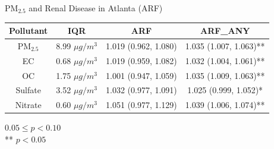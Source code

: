 \documentclass[handout]{beamer} %
\begin{document}
\begin{frame}{PM$_{2.5}$ and Renal Disease in Atlanta (ARF)}
    \begin{table}
        \small
        \centering
        \begin{tabular}{c|c|c|c}
            \hline
            Pollutant & IQR & ARF & ARF\_ANY \\
            \hline
            PM$_{2.5}$ & 8.99 $\mu g/m^3$ & 1.019 (0.962, 1.080) & 1.035 (1.007, 1.063)** \\
            EC & 0.68 $\mu g/m^3$ & 1.019 (0.959, 1.082) & 1.032 (1.004, 1.061)** \\
            OC & 1.75 $\mu g/m^3$ & 1.001 (0.947, 1.059) & 1.035 (1.009, 1.063)** \\
            Sulfate & 3.52 $\mu g/m^3$ & 1.032 (0.977, 1.091) & 1.025 (0.999, 1.052)* \\
            Nitrate & 0.60 $\mu g/m^3$ & 1.051 (0.977, 1.129) & 1.039 (1.006, 1.074)** \\
            \hline
        \end{tabular}
    \end{table}
    {\footnotesize * $0.05 \leq p < 0.10$ \\ ** $p < 0.05$}
\end{frame}
\end{document}
